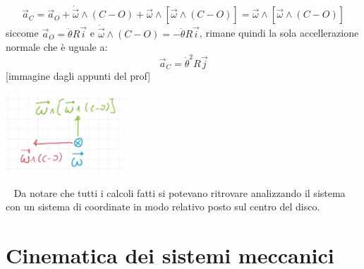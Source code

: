 \[
    \vec{a}_C = \vec{a}_O + \dot{\vec{\omega}} \land (C-O) + \vec{\omega} \land[\vec{\omega} \land (C-O)] = \vec{\omega} \land[\vec{\omega} \land (C-O)]
\]
siccome $\vec{a}_O = \ddot{\theta} R \vec{i}$ e $\dot{\vec{\omega}} \land (C-O) = - \ddot{\theta} R \vec{i}$, rimane quindi la sola accellerazione normale che è uguale a:
\[
    \vec{a}_C = \dot{\theta}^2 R \vec{j}
\]
[immagine dagli appunti del prof]
\begin{center}
    \includegraphics[height=3cm]{../lezione4/img5.JPG}
\end{center}
\ \newline
Da notare che tutti i calcoli fatti si potevano ritrovare analizzando il sistema con un sistema di coordinate in modo relativo posto sul centro del disco.
\newpage
\section{Cinematica dei sistemi meccanici}

